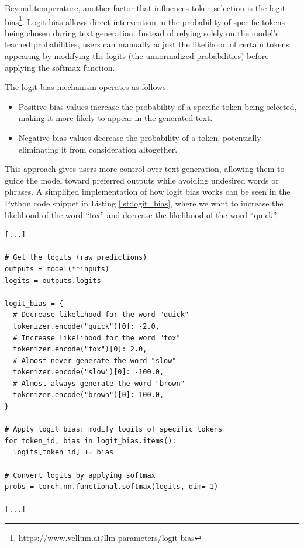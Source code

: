 Beyond temperature, another factor that influences token selection is the logit
bias\footnote{\url{https://www.vellum.ai/llm-parameters/logit-bias}}. Logit bias
allows direct intervention in the probability of specific tokens being chosen
during text generation. Instead of relying solely on the model's learned probabilities,
users can manually adjust the likelihood of certain tokens appearing by
modifying the logits (the unnormalized probabilities) before applying the
softmax function.

The logit bias mechanism operates as follows:

\begin{itemize}
  \item Positive bias values increase the probability of a specific token being selected,
    making it more likely to appear in the generated text.

  \item Negative bias values decrease the probability of a token, potentially
    eliminating it from consideration altogether.
\end{itemize}

This approach gives users more control over text generation, allowing them to
guide the model toward preferred outputs while avoiding undesired words or
phrases. A simplified implementation of how logit bias works can be seen in the Python
code snippet in Listing \ref{lst:logit_bias}, where we want to increase the
likelihood of the word ``fox'' and decrease the likelihood of the word ``quick''.

\vspace{10mm}
\begin{codewindow}
    \begin{lstlisting}
[...]

# Get the logits (raw predictions)
outputs = model(**inputs)
logits = outputs.logits

logit_bias = {
  # Decrease likelihood for the word "quick"
  tokenizer.encode("quick")[0]: -2.0,
  # Increase likelihood for the word "fox"
  tokenizer.encode("fox")[0]: 2.0,
  # Almost never generate the word "slow"
  tokenizer.encode("slow")[0]: -100.0,
  # Almost always generate the word "brown"
  tokenizer.encode("brown")[0]: 100.0,
}

# Apply logit bias: modify logits of specific tokens
for token_id, bias in logit_bias.items():
  logits[token_id] += bias

# Convert logits by applying softmax
probs = torch.nn.functional.softmax(logits, dim=-1)

[...]
\end{lstlisting}
\end{codewindow}
\vspace{10mm}


